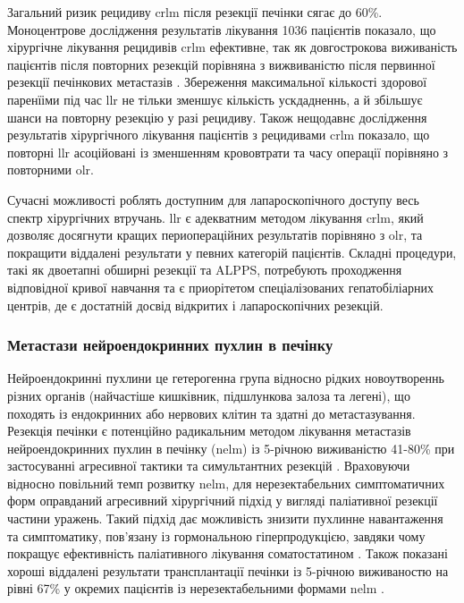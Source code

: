 \begin{refsection}
Загальний ризик рецидиву \acrshort{crlm} після резекції печінки сягає до 60\%. Моноцентрове дослідження результатів лікування 1036 пацієнтів показало, що хірургічне лікування рецидивів \acrshort{crlm} ефективне, так як  довгострокова виживаність пацієнтів після повторних резекцій порівняна з вижвиваністю після первинної резекції печінкових метастазів \cite{Wicherts2013}. Збереження максимальної кількості здорової паренїіми під час \acrshort{llr} не тільки зменшує кількість ускдадненнь, а й збільшує шанси на повторну резекцію у разі рецидиву. Також нещодавнє дослідження результатів хірургічного лікування пацієнтів з рецидивами \acrshort{crlm} показало, що повторні \acrshort{llr} асоційовані із зменшенням крововтрати та часу операції порівняно з повторними \acrshort{olr}. 

Сучасні можливості роблять доступним для лапароскопічного доступу весь спектр хірургічних втручань. \acrshort{llr} є адекватним методом лікування \acrshort{crlm}, який дозволяє досягнути кращих периопераційних результатів порівняно з \acrshort{olr}, та покращити віддалені результати у певних категорій пацієнтів. Складні процедури, такі як  двоетапні обширні резекції та \acrshort{ALPPS}, потребують проходження відповідної кривої навчання та є приорітетом спеціалізованих гепатобіліарних центрів, де є достатній досвід відкритих і лапароскопічних резекцій.

\subsubsection{Метастази нейроендокринних пухлин в печінку}

Нейроендокринні пухлини це гетерогенна група відносно рідких новоутвореннь різних органів (найчастіше кишківник, підшлункова залоза та легені), що походять із ендокринних або нервових клітин та здатні до метастазування. Резекція печінки є потенційно радикальним методом лікування метастазів нейроендокринних пухлин в печінку (\acrshort{nelm}) із 5-річною виживаністю 41-80\% при застосуванні агресивної тактики та симультантних резекцій \cite{Liu2009}. Враховуючи відносно повільний темп розвитку \acrshort{nelm}, для нерезектабельних симптоматичних форм оправданий агресивний хірургічний підхід у вигляді паліативної резекції частини уражень. Такий підхід дає можливість знизити пухлинне навантаження та симптоматику, пов'язану із гормональною гіперпродукцією, завдяки чому покращує ефективність паліативного лікування соматостатином \cite{Schmidt2014}. Також показані хороші віддалені результати трансплантації печінки із 5-річною виживаностю на рівні 67\% у окремих пацієнтів із нерезектабельними формами \acrshort{nelm} \cite{Moris2017a}.


\end{refsection}
